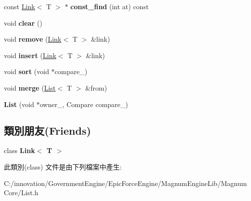 \begin{DoxyCompactItemize}
\item 
const \hyperlink{class_i_dream_sky_1_1_link}{Link}$<$ T $>$ $\ast$ {\bfseries const\+\_\+find} (int at) const \hypertarget{class_i_dream_sky_1_1_list_a8ac96db79c50bd0f42ab454b14dd02d8}{}\label{class_i_dream_sky_1_1_list_a8ac96db79c50bd0f42ab454b14dd02d8}

\item 
void {\bfseries clear} ()\hypertarget{class_i_dream_sky_1_1_list_ad55637feba21a655873f11d3eb04b4a7}{}\label{class_i_dream_sky_1_1_list_ad55637feba21a655873f11d3eb04b4a7}

\item 
void {\bfseries remove} (\hyperlink{class_i_dream_sky_1_1_link}{Link}$<$ T $>$ \&link)\hypertarget{class_i_dream_sky_1_1_list_ab8e8c6c8704398f873d31588ae35c875}{}\label{class_i_dream_sky_1_1_list_ab8e8c6c8704398f873d31588ae35c875}

\item 
void {\bfseries insert} (\hyperlink{class_i_dream_sky_1_1_link}{Link}$<$ T $>$ \&link)\hypertarget{class_i_dream_sky_1_1_list_a25a6ab0b7a82f5a8aa0debdf8c3f4601}{}\label{class_i_dream_sky_1_1_list_a25a6ab0b7a82f5a8aa0debdf8c3f4601}

\item 
void {\bfseries sort} (void $\ast$compare\+\_\+)\hypertarget{class_i_dream_sky_1_1_list_a306c0400b77ff1b0f361be72e84d1859}{}\label{class_i_dream_sky_1_1_list_a306c0400b77ff1b0f361be72e84d1859}

\item 
void {\bfseries merge} (\hyperlink{class_i_dream_sky_1_1_list}{List}$<$ T $>$ \&from)\hypertarget{class_i_dream_sky_1_1_list_acac4d7289e94ce19f2b414046500dcf2}{}\label{class_i_dream_sky_1_1_list_acac4d7289e94ce19f2b414046500dcf2}

\item 
{\bfseries List} (void $\ast$owner\+\_, Compare compare\+\_)\hypertarget{class_i_dream_sky_1_1_list_abd01b1d58c16bf9661758e65661b0ce1}{}\label{class_i_dream_sky_1_1_list_abd01b1d58c16bf9661758e65661b0ce1}

\end{DoxyCompactItemize}
\subsection*{類別朋友(Friends)}
\begin{DoxyCompactItemize}
\item 
class {\bfseries Link$<$ T $>$}\hypertarget{class_i_dream_sky_1_1_list_a434e04a08281382d566369fea09f04f8}{}\label{class_i_dream_sky_1_1_list_a434e04a08281382d566369fea09f04f8}

\end{DoxyCompactItemize}


此類別(class) 文件是由下列檔案中產生\+:\begin{DoxyCompactItemize}
\item 
C\+:/innovation/\+Government\+Engine/\+Epic\+Force\+Engine/\+Magnum\+Engine\+Lib/\+Magnum\+Core/List.\+h\end{DoxyCompactItemize}

